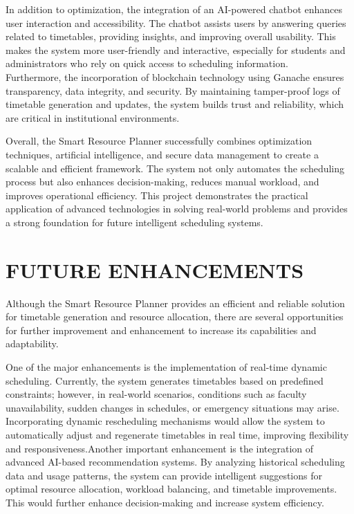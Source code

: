 \documentclass[a4paper, 12pt]{report}
\begin{document}
\par In addition to optimization, the integration of an AI-powered chatbot enhances user interaction and accessibility. The chatbot assists users by answering queries related to timetables, providing insights, and improving overall usability. This makes the system more user-friendly and interactive, especially for students and administrators who rely on quick access to scheduling information.\\

Furthermore, the incorporation of blockchain technology using Ganache ensures transparency, data integrity, and security. By maintaining tamper-proof logs of timetable generation and updates, the system builds trust and reliability, which are critical in institutional environments.

Overall, the Smart Resource Planner successfully combines optimization techniques, artificial intelligence, and secure data management to create a scalable and efficient framework. The system not only automates the scheduling process but also enhances decision-making, reduces manual workload, and improves operational efficiency. This project demonstrates the practical application of advanced technologies in solving real-world problems and provides a strong foundation for future intelligent scheduling systems.

\section{FUTURE ENHANCEMENTS}

\par Although the Smart Resource Planner provides an efficient and reliable solution for timetable generation and resource allocation, there are several opportunities for further improvement and enhancement to increase its capabilities and adaptability.\\

\par One of the major enhancements is the implementation of real-time dynamic scheduling. Currently, the system generates timetables based on predefined constraints; however, in real-world scenarios, conditions such as faculty unavailability, sudden changes in schedules, or emergency situations may arise. Incorporating dynamic rescheduling mechanisms would allow the system to automatically adjust and regenerate timetables in real time, improving flexibility and responsiveness.Another important enhancement is the integration of advanced AI-based recommendation systems. By analyzing historical scheduling data and usage patterns, the system can provide intelligent suggestions for optimal resource allocation, workload balancing, and timetable improvements. This would further enhance decision-making and increase system efficiency.\\
\end{document}
